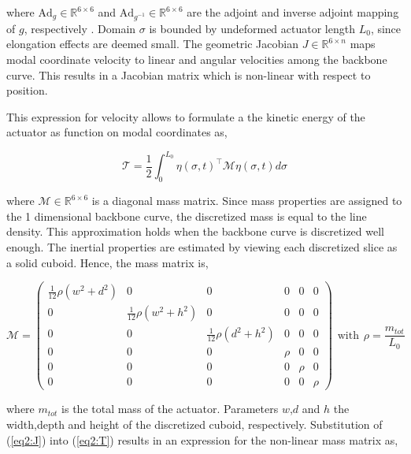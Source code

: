 where $\text{Ad}_g \in \mathbb{R}^{6 \times 6}$ and $\text{Ad}_{g^{-1}}  \in \mathbb{R}^{6 \times 6}$ are the adjoint and inverse adjoint mapping of $g$, respectively \cite{Sola2018}. Domain $\sigma$ is bounded by undeformed actuator length $L_0$, since elongation effects are deemed small. The geometric Jacobian $J \in \mathbb{R}^{6\times n}$ maps modal coordinate velocity to linear and angular velocities among the backbone curve. This results in a Jacobian matrix which is non-linear with respect to position. 

This expression for velocity allows to formulate a the kinetic energy of the actuator as function on modal coordinates as,

\begin{equation}
    \mathcal{T} = \frac{1}{2}\int_0^{L_0} \eta(\sigma,t)^\top \mathcal{M} \eta(\sigma,t) d \sigma 
    \label{eq2:T}
\end{equation}

where $\mathcal{M} \in \mathbb{R}^{6\times6}$ is a diagonal mass matrix. Since mass properties are assigned to the 1 dimensional backbone curve, the discretized mass is equal to the line density. This approximation holds when the backbone curve is discretized well enough. The inertial properties are estimated by viewing each discretized slice as a solid cuboid. Hence, the mass matrix is,

\begin{equation}
    \mathcal{M} = \begin{pmatrix} \frac{1}{12}\rho (w^2 + d^2) & 0 & 0 & 0 & 0 & 0 \\
                                  0 & \frac{1}{12}\rho (w^2 + h^2) & 0 & 0 & 0 & 0 \\
                                  0 & 0 & \frac{1}{12}\rho (d^2 + h^2) & 0 & 0 & 0 \\
                                  0 & 0 & 0 & \rho & 0 & 0 \\
                                  0 & 0 & 0 & 0 & \rho & 0 \\
                                  0 & 0 & 0 & 0 & 0 & \rho \end{pmatrix}\hspace{5pt} \text{with} \hspace{5pt} \rho = \frac{m_{tot}}{L_0}
\end{equation} 

where $m_{tot}$ is the total mass of the actuator. Parameters $w$,$d$ and $h$ the width,depth and height of the discretized cuboid, respectively. Substitution of (\ref{eq2:J}) into (\ref{eq2:T}) results in an expression for the non-linear mass matrix as,


